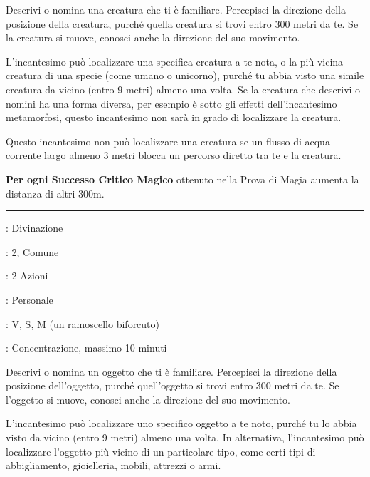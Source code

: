 \begin{multicols}{2}
Descrivi o nomina una creatura che ti è familiare. Percepisci la direzione della posizione della creatura, purché quella creatura si trovi entro 300 metri da te. Se la creatura si muove, conosci anche la direzione del suo movimento.

L'incantesimo può localizzare una specifica creatura a te nota, o la più vicina creatura di una specie (come umano o unicorno), purché tu abbia visto una simile creatura da vicino (entro 9 metri) almeno una volta. Se la creatura che descrivi o nomini ha una forma diversa, per esempio è sotto gli effetti dell'incantesimo metamorfosi, questo incantesimo non sarà in grado di localizzare la creatura.

Questo incantesimo non può localizzare una creatura se un flusso di acqua corrente largo almeno 3 metri blocca un percorso diretto tra te e la creatura.

\textbf{Per ogni Successo Critico Magico} ottenuto nella Prova di Magia aumenta la distanza di altri 300m.

\smallskip\noindent\rule{\linewidth}{2pt} \hypertarget{Localizza Oggetto}{}\medskip{}
\noindent
\begin{description}[noitemsep, topsep=0pt, parsep=0pt, partopsep=0pt, leftmargin=0cm, labelwidth=2.8cm]
	\item[\textbf{Lista di Magia}]: Divinazione
	\item[\textbf{Livello}]: 2, Comune
	\item[\textbf{T. di Lancio}]: 2 Azioni
	\item[\textbf{Gittata}]: Personale
	\item[\textbf{Componenti}]: V, S, M (un ramoscello biforcuto)
	\item[\textbf{Durata}]: Concentrazione, massimo 10 minuti
\end{description}

Descrivi o nomina un oggetto che ti è familiare. Percepisci la direzione della posizione dell'oggetto, purché quell'oggetto si trovi entro 300 metri da te. Se l'oggetto si muove, conosci anche la direzione del suo movimento.

L'incantesimo può localizzare uno specifico oggetto a te noto, purché tu lo abbia visto da vicino (entro 9 metri) almeno una volta. In alternativa, l'incantesimo può localizzare l'oggetto più vicino di un particolare tipo, come certi tipi di abbigliamento, gioielleria, mobili, attrezzi o armi.


\end{multicols}
